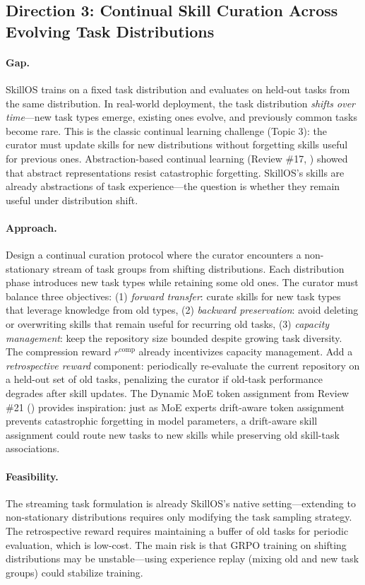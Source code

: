 \documentclass[11pt]{article}
\begin{document}
\subsection{Direction 3: Continual Skill Curation Across Evolving Task Distributions}

\paragraph{Gap.}
SkillOS trains on a fixed task distribution and evaluates on held-out tasks from the same distribution. In real-world deployment, the task distribution \emph{shifts over time}---new task types emerge, existing ones evolve, and previously common tasks become rare. This is the classic continual learning challenge (Topic 3): the curator must update skills for new distributions without forgetting skills useful for previous ones. Abstraction-based continual learning (Review \#17, \cite{abstraction}) showed that abstract representations resist catastrophic forgetting. SkillOS's skills are already abstractions of task experience---the question is whether they remain useful under distribution shift.

\paragraph{Approach.}
Design a continual curation protocol where the curator encounters a non-stationary stream of task groups from shifting distributions. Each distribution phase introduces new task types while retaining some old ones. The curator must balance three objectives: (1) \emph{forward transfer}: curate skills for new task types that leverage knowledge from old types, (2) \emph{backward preservation}: avoid deleting or overwriting skills that remain useful for recurring old tasks, (3) \emph{capacity management}: keep the repository size bounded despite growing task diversity. The compression reward $r^{\mathrm{comp}}$ already incentivizes capacity management. Add a \emph{retrospective reward} component: periodically re-evaluate the current repository on a held-out set of old tasks, penalizing the curator if old-task performance degrades after skill updates. The Dynamic MoE token assignment from Review \#21 (\cite{dynamicmoe}) provides inspiration: just as MoE experts drift-aware token assignment prevents catastrophic forgetting in model parameters, a drift-aware skill assignment could route new tasks to new skills while preserving old skill-task associations.

\paragraph{Feasibility.}
The streaming task formulation is already SkillOS's native setting---extending to non-stationary distributions requires only modifying the task sampling strategy. The retrospective reward requires maintaining a buffer of old tasks for periodic evaluation, which is low-cost. The main risk is that GRPO training on shifting distributions may be unstable---using experience replay (mixing old and new task groups) could stabilize training.
\end{document}
